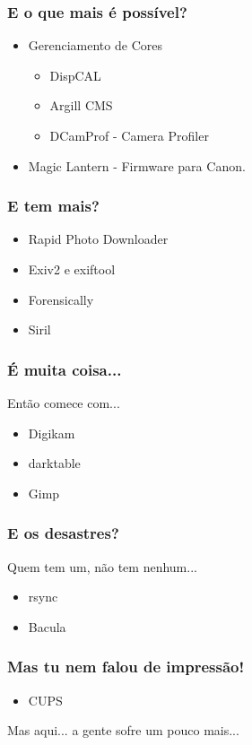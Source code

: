 
\begin{frame}
    \frametitle{E o que mais é possível?}
    \begin{itemize}
        \item Gerenciamento de Cores
        \begin{itemize}
            \item DispCAL
            \item Argill CMS
            \item DCamProf - Camera Profiler
        \end{itemize}
        \item Magic Lantern - Firmware para Canon.
    \end{itemize}
\end{frame}

\begin{frame}
    \frametitle{E tem mais?}
    \begin{itemize}
        \item Rapid Photo Downloader
        \item Exiv2 e exiftool
        \item Forensically
        \item Siril
    \end{itemize}
\end{frame}

\begin{frame}
    \frametitle{É muita coisa...}
    Então comece com...
    \begin{itemize}
        \item Digikam
        \item darktable
        \item Gimp
    \end{itemize}
\end{frame}

\begin{frame}
    \frametitle{E os desastres?}
    Quem tem um, não tem nenhum...
    \begin{itemize}
        \item rsync
        \item Bacula
    \end{itemize}
\end{frame}

\begin{frame}
    \frametitle{Mas tu nem falou de impressão!}
    \begin{itemize}
        \item CUPS
    \end{itemize}
    Mas aqui... a gente sofre um pouco mais...
\end{frame}

